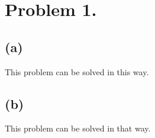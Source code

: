 \section*{Problem 1.}

\subsection*{(a)}

This problem can be solved in this way.

\subsection*{(b)}

This problem can be solved in that way.
